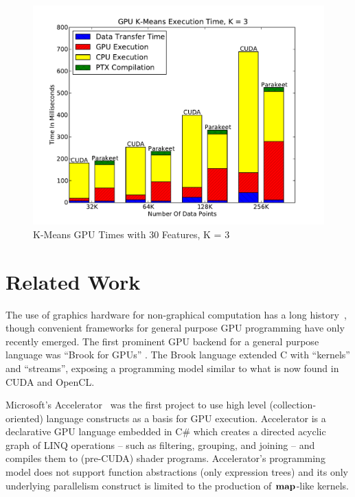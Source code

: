 \documentclass[preprint]{sigplanconf}
\begin{document}
\begin{figure}
\includegraphics[scale=0.45]{KMGPU.pdf}
\caption{K-Means GPU Times with 30 Features, K = 3}
\label{KMGPU}
\end{figure}

\section{Related Work}
\label{RelatedWork}
The use of graphics hardware for non-graphical computation has a  long history~\cite{Leng90}, though convenient frameworks for general purpose GPU programming have only recently emerged. The first prominent GPU backend for a general purpose language was ``Brook for GPUs'' \cite{Buck04}. The Brook language extended C with ``kernels'' and ``streams'', exposing a programming model similar to what is now found in CUDA and OpenCL.

Microsoft's Accelerator~\cite{Tard06} was the first project to use high level (collection-oriented) language constructs as a basis for GPU execution. Accelerator is a declarative GPU language embedded in C\# which creates a directed acyclic graph of LINQ operations -- such as filtering, grouping, and joining -- and compiles them to (pre-CUDA) shader programs. Accelerator's programming model does not support function abstractions (only expression trees) and its only underlying parallelism construct is limited to the production of $\mbox{\textbf{map}}$-like kernels.
\end{document}
